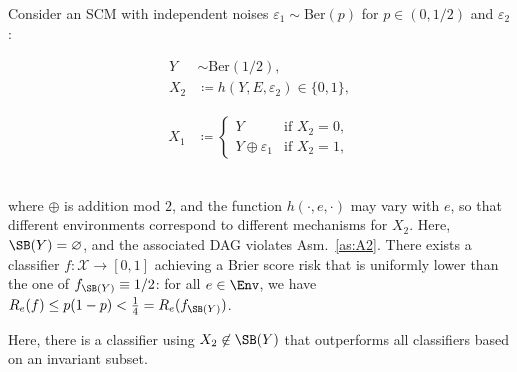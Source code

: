 \begin{example} \label{ex:star_counterexample}
Consider an SCM with independent noises $\varepsilon_1 \sim \mathrm{Ber}(p)$ for $p \in (0,1/2)$ and $\varepsilon_2$:\\[0pt]
\begin{minipage}{0.32\textwidth}
\begin{align*}
    Y &\sim \mathrm{Ber}(1/2), \\
    X_2 &\coloneq h(Y,E,\varepsilon_2) \in \{0,1\},
\end{align*}
\end{minipage}
\hfill
\begin{minipage}{0.32\textwidth}
\begin{align*}
    X_1  &\coloneq 
\begin{cases}
Y & \text{if } X_2 = 0,\\
Y \oplus \varepsilon_1 & \text{if } X_2 = 1,
\end{cases}
\end{align*}
\end{minipage}
\hfill
\begin{minipage}{0.32\textwidth}
\centering
\vspace*{0.1em}

\end{minipage}\\[1pt]
where $\oplus$ is addition mod $2$, and %
the function $h(\cdot,e,\cdot)$ may vary with $e$, so that
different environments correspond to different mechanisms for $X_2$.
%
%
%
Here, $\SB(Y) = \varnothing$, and the associated DAG violates Asm.~\ref{as:A2}. There exists a classifier $f\colon \mathcal{X} \to [0,1]$ achieving a
Brier score risk 
that is uniformly lower than the one of
$f_{\SB(Y)} \equiv 1/2$: for all $e \in \Env$, we have
$R_e(f) \leq p(1-p) < \tfrac{1}{4} = R_e(f_{\SB(Y)})$. 
\end{example}
Here, 
there is 
a classifier
using
$X_2 \not\in \SB(Y)$
that 
outperforms all classifiers based on an invariant subset.
